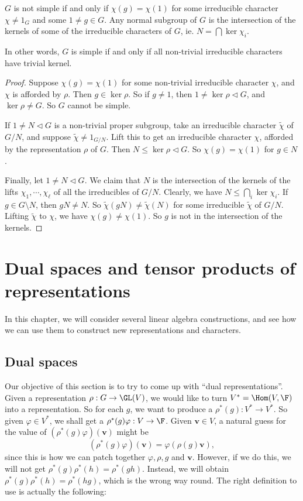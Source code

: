 \documentclass[a4paper]{article}
\begin{document}
\begin{lemma}
  $G$ is not simple if and only if $\chi(g) = \chi(1)$ for some irreducible character $\chi \not= 1_G$ and some $1 \not= g \in G$. Any normal subgroup of $G$ is the intersection of the kernels of some of the irreducible characters of $G$, ie. $N = \bigcap \ker \chi_i$.
\end{lemma}
In other words, $G$ is simple if and only if all non-trivial irreducible characters have trivial kernel.

\begin{proof}
  Suppose $\chi(g) = \chi(1)$ for some non-trivial irreducible character $\chi$, and $\chi$ is afforded by $\rho$. Then $g \in \ker \rho$. So if $g \not= 1$, then $1 \not= \ker \rho \lhd G$, and $\ker \rho \not= G$. So $G$ cannot be simple.

  If $1 \not= N \lhd G$ is a non-trivial proper subgroup, take an irreducible character $\tilde{\chi}$ of $G/N$, and suppose $\tilde{\chi} \not= 1_{G/N}$. Lift this to get an irreducible character $\chi$, afforded by the representation $\rho$ of $G$. Then $N \leq \ker \rho \lhd G$. So $\chi(g) = \chi(1)$ for $g \in N$.

  Finally, let $1 \not= N \lhd G$. We claim that $N$ is the intersection of the kernels of the lifts $\chi_1, \cdots, \chi_\ell$ of all the irreducibles of $G/N$. Clearly, we have $N \leq \bigcap_i \ker \chi_i$. If $g \in G \setminus N$, then $gN \not= N$. So $\tilde{\chi}(gN) \not= \tilde{\chi}(N)$ for some irreducible $\tilde{\chi}$ of $G/N$. Lifting $\tilde{\chi}$ to $\chi$, we have $\chi(g) \not= \chi(1)$. So $g$ is not in the intersection of the kernels. %
\end{proof}

\section{Dual spaces and tensor products of representations}
In this chapter, we will consider several linear algebra constructions, and see how we can use them to construct new representations and characters.

\subsection{Dual spaces}
Our objective of this section is to try to come up with ``dual representations''. Given a representation $\rho: G \to \GL(V)$, we would like to turn $V^* = \Hom(V, \F)$ into a representation. So for each $g$, we want to produce a $\rho^*(g): V^* \to V^*$. So given $\varphi \in V^*$, we shall get a $\rho^*(g) \varphi: V \to \F$. Given $\mathbf{v} \in V$, a natural guess for the value of $(\rho^*(g)\varphi)(\mathbf{v})$ might be
\[
  (\rho^*(g) \varphi)(\mathbf{v}) = \varphi(\rho(g)\mathbf{v}),
\]
since this is how we can patch together $\varphi, \rho, g$ and $\mathbf{v}$. However, if we do this, we will not get $\rho^*(g) \rho^*(h) = \rho^*(gh)$. Instead, we will obtain $\rho^*(g) \rho^*(h) = \rho^*(hg)$, which is the wrong way round. The right definition to use is actually the following:
\end{document}
